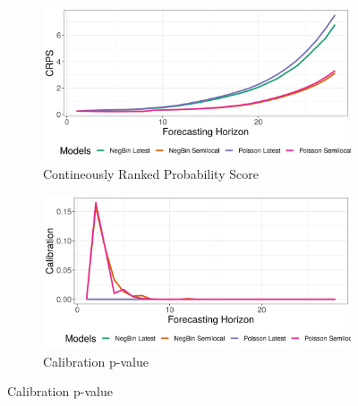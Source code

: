 \begin{figure}[H]
\begin{subfigure}{0.5\textwidth}
  \centering
  \includegraphics[width=\linewidth]{../output/Vuhovi_crps.png}  
  \caption{Contineously Ranked Probability Score}
  \label{Vuhovi_scores_1}
\end{subfigure}
\begin{subfigure}{0.5\textwidth}
  \centering
  \includegraphics[width=\linewidth]{../output/Vuhovi_calibration.png}  
  \caption{Calibration p-value}
  \label{Vuhovi_scores_2}
\end{subfigure}


\end{figure}
